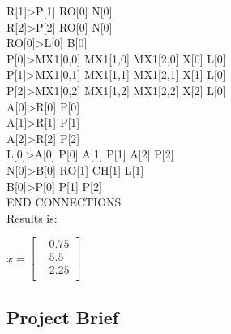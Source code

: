 \documentclass[12pt,a4paper]{article}
\begin{document}
R[1]>P[1] RO[0] N[0]\\
R[2]>P[2] RO[0] N[0]\\
RO[0]>L[0] B[0]\\
P[0]>MX1[0,0] MX1[1,0] MX1[2,0] X[0] L[0]\\
P[1]>MX1[0,1] MX1[1,1] MX1[2,1] X[1] L[0]\\
P[2]>MX1[0,2] MX1[1,2] MX1[2,2] X[2] L[0]\\
A[0]>R[0] P[0]\\
A[1]>R[1] P[1]\\
A[2]>R[2] P[2]\\
L[0]>A[0] P[0] A[1] P[1] A[2] P[2]\\
N[0]>B[0] RO[1] CH[1] L[1]\\
B[0]>P[0] P[1] P[2]\\
END CONNECTIONS\\

Results is:

$x=\begin{bmatrix}
-0.75\\
-5.5\\
-2.25\\
\end{bmatrix}$
     
\subsection{Project Brief}
\newpage
\end{document}
